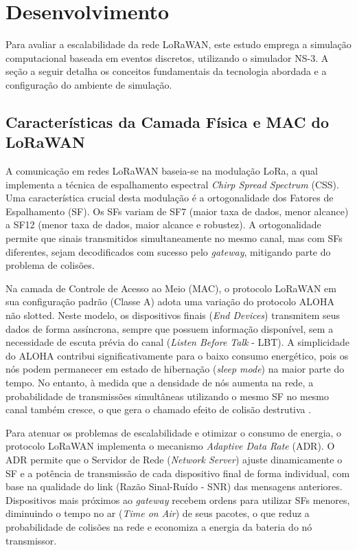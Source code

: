 \vspace*{1cm}
\chapter{Desenvolvimento} \label{chap:estrutura}

Para avaliar a escalabilidade da rede LoRaWAN, este estudo emprega a simulação computacional baseada em eventos discretos, utilizando o simulador NS-3. A seção a seguir detalha os conceitos fundamentais da tecnologia abordada e a configuração do ambiente de simulação.

\section{Características da Camada Física e MAC do LoRaWAN}

A comunicação em redes LoRaWAN baseia-se na modulação LoRa, a qual implementa a técnica de espalhamento espectral \textit{Chirp Spread Spectrum} (CSS). Uma característica crucial desta modulação é a ortogonalidade dos Fatores de Espalhamento (SF). Os SFs variam de SF7 (maior taxa de dados, menor alcance) a SF12 (menor taxa de dados, maior alcance e robustez). A ortogonalidade permite que sinais transmitidos simultaneamente no mesmo canal, mas com SFs diferentes, sejam decodificados com sucesso pelo \textit{gateway}, mitigando parte do problema de colisões.

Na camada de Controle de Acesso ao Meio (MAC), o protocolo LoRaWAN em sua configuração padrão (Classe A) adota uma variação do protocolo ALOHA não slotted. Neste modelo, os dispositivos finais (\textit{End Devices}) transmitem seus dados de forma assíncrona, sempre que possuem informação disponível, sem a necessidade de escuta prévia do canal (\textit{Listen Before Talk} - LBT). A simplicidade do ALOHA contribui significativamente para o baixo consumo energético, pois os nós podem permanecer em estado de hibernação (\textit{sleep mode}) na maior parte do tempo. No entanto, à medida que a densidade de nós aumenta na rede, a probabilidade de transmissões simultâneas utilizando o mesmo SF no mesmo canal também cresce, o que gera o chamado efeito de colisão destrutiva \cite{VanAbeele2017}.

Para atenuar os problemas de escalabilidade e otimizar o consumo de energia, o protocolo LoRaWAN implementa o mecanismo \textit{Adaptive Data Rate} (ADR). O ADR permite que o Servidor de Rede (\textit{Network Server}) ajuste dinamicamente o SF e a potência de transmissão de cada dispositivo final de forma individual, com base na qualidade do link (Razão Sinal-Ruído - SNR) das mensagens anteriores. Dispositivos mais próximos ao \textit{gateway} recebem ordens para utilizar SFs menores, diminuindo o tempo no ar (\textit{Time on Air}) de seus pacotes, o que reduz a probabilidade de colisões na rede e economiza a energia da bateria do nó transmissor.

